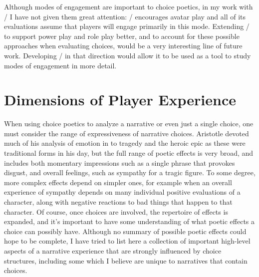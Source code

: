 Although modes of engagement are important to choice poetics, in my work with \dunyazad/ I have not given them great attention: \dunyazad/ encourages avatar play and all of its evaluations assume that players will engage primarily in this mode.
%
Extending \dunyazad/ to support power play and role play better, and to account for these possible approaches when evaluating choices, would be a very interesting line of future work.
%
Developing \dunyazad/ in that direction would allow it to be used as a tool to study modes of engagement in more detail.


\section{Dimensions of Player Experience}

When using choice poetics to analyze a narrative or even just a single choice, one must consider the range of expressiveness of narrative choices.
%
Aristotle devoted much of his analysis of emotion in  to tragedy and the heroic epic as these were traditional forms in his day, but the full range of poetic effects is very broad, and includes both momentary impressions such as a single phrase that provokes disgust, and overall feelings, such as sympathy for a tragic figure.
%
To some degree, more complex effects depend on simpler ones, for example when an overall experience of sympathy depends on many individual positive evaluations of a character, along with negative reactions to bad things that happen to that character.
%
Of course, once choices are involved, the repertoire of effects is expanded, and it's important to have some understanding of what poetic effects a choice can possibly have.
%
Although no summary of possible poetic effects could hope to be complete, I have tried to list here a collection of important high-level aspects of a narrative experience that are strongly influenced by choice structures, including some which I believe are unique to narratives that contain choices.


